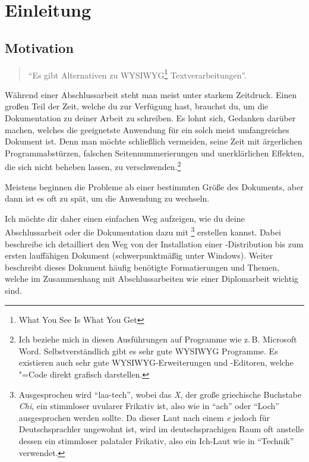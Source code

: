 %
%

\chapter{Einleitung}

\section{Motivation}
\label{sec:motivation}

\begin{quote}
\enquote{Es gibt Alternativen zu WYSIWYG\footnote{What You See Is What You Get} Textverarbeitungen}.
\end{quote}

Während einer Abschlussarbeit steht man meist unter starkem Zeitdruck. Einen großen Teil der Zeit, welche du zur Verfügung hast, brauchst du, um die Dokumentation zu deiner Arbeit zu schreiben. Es lohnt sich, Gedanken darüber machen, welches die geeignetste Anwendung für ein solch meist umfangreiches Dokument ist. Denn man möchte schließlich vermeiden, seine Zeit mit ärgerlichen Programmabstürzen, falschen Seitennummerierungen und unerklärlichen Effekten, die sich nicht beheben lassen, zu verschwenden.\footnote{Ich beziehe mich in diesen Ausführungen auf Programme wie z.\,B. Microsoft Word. Selbstverständlich gibt es sehr gute WYSIWYG Programme. Es existieren auch sehr gute WYSIWYG-Erweiterungen und -Editoren, welche \DMLLaTeX"=Code direkt grafisch darstellen.}

Meistens beginnen die Probleme ab einer bestimmten Größe des Dokuments, aber dann ist es oft zu spät, um die Anwendung zu wechseln.

Ich möchte dir daher einen einfachen Weg aufzeigen, wie du deine Abschlussarbeit oder die Dokumentation dazu mit \DMLLaTeX\footnote{Ausgesprochen wird \DMLLaTeX{} \enquote{laa-tech}, wobei das \emph{X}, der große griechische Buchstabe \emph{Chi}, ein stimmloser uvularer Frikativ ist, also wie in \enquote{ach} oder \enquote{Loch} ausgesprochen werden sollte. Da dieser Laut nach einem \emph{e} jedoch für Deutschsprachler ungewohnt ist, wird im deutschsprachigen Raum oft anstelle dessen ein stimmloser palataler Frikativ, also ein Ich-Laut wie in \enquote{Technik} verwendet.} erstellen kannst. Dabei beschreibe ich detailliert den Weg von der Installation einer \DMLLaTeX-Distribution bis zum ersten lauf\/fähigen Dokument (schwerpunktmäßig unter Windows). Weiter beschreibt dieses Dokument häufig benötigte Formatierungen und Themen, welche im Zusammenhang mit Abschlussarbeiten wie einer Diplomarbeit wichtig sind.

